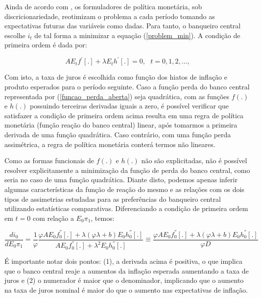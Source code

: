 \documentclass[
	article,			%
	11pt,				%
	oneside,			%
	a4paper,			%
	english,			%
	brazil,				%
	]{abntex2}
\begin{document}
	Ainda de acordo com , os formuladores de política monetária, sob discricionariedade, reotimizam o problema a cada período tomando as expectativas futuras das variáveis como dadas. Para tanto, o banqueiro central escolhe $i_t$ de tal forma a minimizar a equação (\ref{problem_min}). A condição de primeira ordem é dada por:
	
	\begin{equation}
		AE_tf^'[.] + \lambda E_{t} h^' [.] = 0, \mbox{ } t = 0, 1, 2, ...,
	\end{equation}

	Com isto, a taxa de juros é escolhida como função dos hiatos de inflação e produto esperados para o período seguinte. Caso a função perda do banco central representada por (\ref{funcao_perda_aberta}) seja quadrática, com as funções $f(.)$ e $h(.)$ possuindo terceiras derivadas iguais a zero, é possível verificar que satisfazer a condição de primeira ordem acima resulta em uma regra de política monetária (função reação do banco central) linear, após tomarmos a primeira derivada de uma função quadrática. Caso contrário, com uma função perda assimétrica, a regra de política monetária conterá termos não lineares.
	
	Como as formas funcionais de $f(.)$ e $h(.)$ não são explicitadas, não é possível resolver explicitamente a minimização da função de perda do banco central, como seria no caso de uma função quadrática. Diante disto, podemos apenas inferir algumas características da função de reação do mesmo e as relações com os dois tipos de assimetrias estudadas para as preferências do banqueiro central utilizando estatísticas comparativas. Diferenciando a condição de primeira ordem em $t=0$ com relação a $E_0\pi_1$, temos:
	
	\begin{equation}
		\frac{di_0}{dE_0\pi_1} = \frac{1}{\varphi} \frac{\varphi A E_0 f_0^{''} [.] + \lambda(\varphi\lambda + b)E_0h_0^{''}[.]}{AE_0f_0^{''}[.] + \lambda^2E_0h_0^{''}[.]} \equiv \frac{\varphi A E_0 f_0^{''}[.] + \lambda(\varphi\lambda + b)E_0h_0^{''}[.]}{\varphi D}
	\end{equation}
	
	É importante notar dois pontos: (1), a derivada acima é positiva, o que implica que o banco central reaje a aumentos da inflação esperada aumentando a taxa de juros e (2) o numerador é maior que o denominador, implicando que o aumento na taxa de juros nominal é maior do que o aumento nas expectativas de inflação.
	
\end{document}
